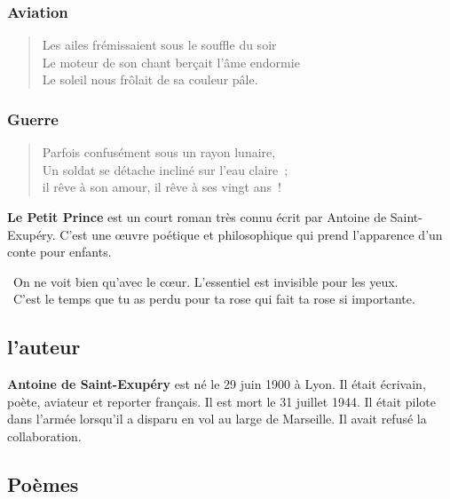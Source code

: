 {\selectfont 

  \subsubsection*{Aviation}

  \begin{verse}
    Les ailes frémissaient sous le souffle du soir \\
	  Le moteur de son chant berçait l'âme endormie \\
	  Le soleil nous frôlait de sa couleur pâle.
  \end{verse}
  
  \subsubsection*{Guerre}
  
  \begin{verse}
	  Parfois confusément sous un rayon lunaire,\\
	  Un soldat se détache incliné sur l'eau claire ; \\
	  il rêve à son amour, il rêve à ses vingt ans !
  \end{verse}
}

\horrule{1px}

\textbf{Le Petit Prince} est un court roman très connu écrit par Antoine de Saint-Exupéry. 
C'est une œuvre poétique et philosophique qui prend l'apparence d'un conte pour enfants. 

\begin{center}
  {\selectfont \og On ne voit bien qu'avec le cœur. L'essentiel est invisible pour les yeux. \fg }\\
  {\selectfont \og C'est le temps que tu as perdu pour ta rose qui fait ta rose si importante. \fg}\\

\end{center}

\subsection*{l’auteur}
\textbf{Antoine de Saint-Exupéry} est né le 29 juin 1900 à Lyon. Il était  écrivain, poète, aviateur et reporter français. Il est mort le 31 juillet 1944. Il était pilote dans l’armée lorsqu’il a disparu en vol au large de Marseille. Il avait refusé la collaboration.

\subsection*{Poèmes}

